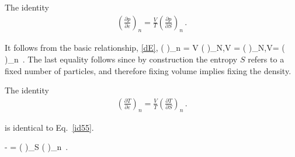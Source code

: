 The identity 
\begin{align}\label{id55}
\left(\frac{\partial p }{ \partial \varepsilon } \right)_n = \frac{V}{T} \left( \frac{\partial p}{\partial S} \right)_n\, .
\end{align}

It follows from the basic relationship, \eqref{dE},
\be
\left( \right)_n = V \left( \right)_{N,V} =  \left( \right)_{N,V}=
  \left( \right)_{n}\, .
\ee
The last equality follows since by construction the entropy $S$ refers to a fixed number of particles, and therefore fixing volume implies fixing the density.
%

The identity 
\begin{align}\label{id55A}
\left(\frac{\partial T }{ \partial \varepsilon } \right)_n = \frac{V}{T} \left( \frac{\partial T}{\partial S} \right)_n\, .
\end{align}

 is identical to Eq.~\eqref{id55}.

\be\label{inv_c}
 -   =  \left(  \right)_S  \left(  \right)_n\, .
\ee

